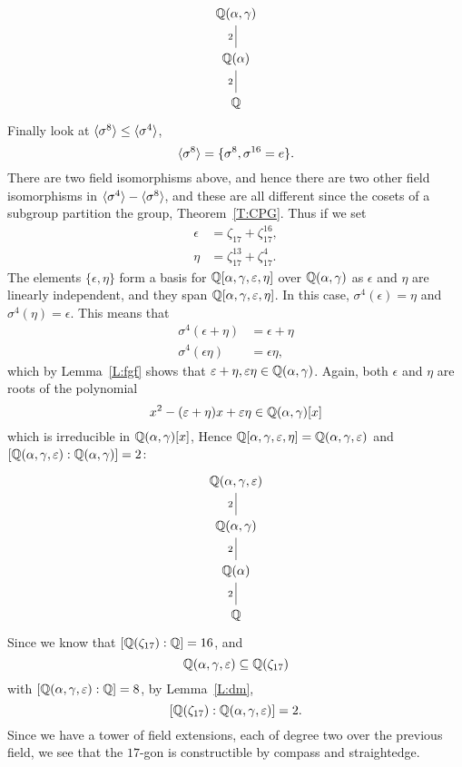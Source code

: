 \documentclass{ximera}
\begin{document}
\begin{example}
  \[
  \begin{tikzcd}
    \Q(\alpha,\gamma)\\
    \Q(\alpha) \ar[u,-,"2"]\\
    \Q \ar[u,-,"2"]
  \end{tikzcd}
  \]
  Finally look at $\langle\sigma^8\rangle\leq \langle\sigma^4\rangle$,
  \[
  \langle\sigma^8\rangle = \{ \sigma^8,\sigma^{16} = e\}.
  \]
  There are two field isomorphisms above, and hence there are two
  other field isomorphisms in $\langle\sigma^4\rangle - \langle \sigma^8\rangle$, and
  these are all different since the cosets of a subgroup partition the
  group, Theorem~\ref{T:CPG}. Thus if we set
  \begin{align*}
    \epsilon &= \zeta_{17} + \zeta_{17}^{16},\\
    \eta &= \zeta_{17}^{13} + \zeta_{17}^4.
  \end{align*}
  The elements $\{\epsilon,\eta\}$ form a basis for
  $\mathbb Q[\alpha,\gamma,\varepsilon,\eta]$ over $\mathbb Q(\alpha,\gamma)$ as
  $\epsilon$ and $\eta$ are linearly independent, and they span
  $\mathbb Q[\alpha,\gamma,\varepsilon,\eta]$.  In this case,
  $\sigma^4(\epsilon) = \eta$ and $\sigma^4(\eta) = \epsilon$. This
  means that
  \begin{align*}
    \sigma^4(\epsilon+\eta) &= \epsilon + \eta\\
    \sigma^4(\epsilon\eta) &= \epsilon\eta,
  \end{align*}
  which by Lemma~\ref{L:fgf} shows that
  $\varepsilon+\eta,\varepsilon\eta\in\mathbb Q(\alpha,\gamma)$. Again, both
  $\epsilon$ and $\eta$ are roots of the polynomial
  \[
  x^2 - (\varepsilon +\eta) x + \varepsilon\eta\in\mathbb Q(\alpha,\gamma)[x]
  \]
  which is irreducible in $\mathbb Q(\alpha,\gamma)[x]$, Hence
  $\mathbb Q[\alpha,\gamma,\varepsilon,\eta]= \mathbb Q(\alpha,\gamma,\varepsilon)$ and
  $[\mathbb Q(\alpha,\gamma,\varepsilon):\mathbb Q(\alpha,\gamma)] = 2$:
  \[
  \begin{tikzcd}
    \Q(\alpha,\gamma,\epsilon)\\
    \Q(\alpha,\gamma)\ar[u,-,"2"]\\
    \Q(\alpha) \ar[u,-,"2"]\\
    \Q \ar[u,-,"2"]
  \end{tikzcd}
  \]
  Since we know that $[\mathbb Q(\zeta_{17}):\mathbb Q] = 16$, and
  \[
  \mathbb Q(\alpha,\gamma,\varepsilon)\subseteq \mathbb Q(\zeta_{17})
  \]
  with $[\mathbb Q(\alpha,\gamma,\varepsilon):\mathbb Q]=8$, by Lemma~\ref{L:dm},
  \[
    [\mathbb Q(\zeta_{17}):\mathbb Q(\alpha,\gamma,\varepsilon)]=2.
  \]
  Since we have a tower of field extensions, each of degree two over
  the previous field, we see that the $17$-gon is constructible by
  compass and straightedge.
\end{example}
\end{document}
